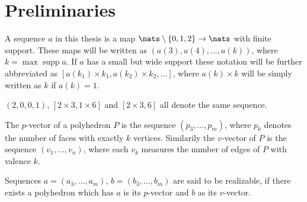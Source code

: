 \section{Preliminaries}

\begin{definition}[Sequence]
  A sequence $a$ in this thesis is a map $\nats \setminus \{0, 1, 2\} \rightarrow \nats$ with finite support. These maps will be written as $(a(3), a(4), ..., a(k))$, where $k = \operatorname{max} \operatorname{supp} a$. If $a$ has a small but wide support these notation will be further abbreviated as $[a(k_1) \times k_1, a(k_2) \times k_2, ...]$, where $a(k) \times k$ will be simply written as $k$ if $a(k) = 1$.
\end{definition}
\begin{example}
  $(2, 0, 0, 1)$, $[2 \times 3, 1 \times 6]$ and $[2 \times 3, 6]$ all denote the same sequence. 
\end{example}
\begin{definition}\label{def_relizable}
  The $p$-vector of a polyhedron $P$ is the sequence $(p_3, \dots, p_m)$, where $p_k$ denotes the number of faces with exactly $k$ vertices. Similarily the $v$-vector of $P$ is the sequence $(v_1, \dots, v_n)$, where each $v_k$ measures the number of edges of $P$ with valence $k$. 
\end{definition}

\begin{definition}
Sequences $a = (a_3, \dots, a_m)$, $b = (b_3, \dots, b_m)$ are said to be realizable, if there exists a polyhedron which has $a$ is its $p$-vector and $b$ as its $v$-vector.
\end{definition}


